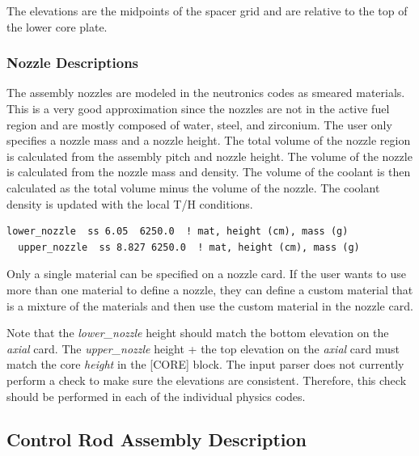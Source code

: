 The elevations are the midpoints of the spacer grid and are relative to the top of the lower core plate.

\subsubsection{Nozzle Descriptions}

The assembly nozzles are modeled in the neutronics codes as smeared materials.  This is a very good
approximation since the nozzles are not in the active fuel region and are mostly
composed of water, steel, and zirconium.  The user only specifies a nozzle mass and a nozzle height.
The total volume of the nozzle region is calculated from the assembly pitch and nozzle height.
The volume of the nozzle is calculated from the nozzle mass and density.
The volume of the coolant is then calculated as the total volume minus the volume of the nozzle.
The coolant density is updated with the local T/H conditions.


\begin{Verbatim}[fontsize=\small]
  lower_nozzle  ss 6.05  6250.0  ! mat, height (cm), mass (g)
  upper_nozzle  ss 8.827 6250.0  ! mat, height (cm), mass (g)
\end{Verbatim}

Only a single material can be specified on a nozzle card.  If the user wants to use
more than one material to define a nozzle, they can define a custom material that
is a mixture of the materials and then use the custom material in the nozzle card.

Note that the {\it lower\_nozzle} height should match the bottom elevation on the {\it axial} card.
The {\it upper\_nozzle} height + the top elevation on the {\it axial} card must match the
core {\it height} in the [CORE] block.
The input parser does not currently perform a check to make sure the elevations are consistent.
Therefore, this check should be performed in each of the individual physics codes.

\subsection{Control Rod Assembly Description}


